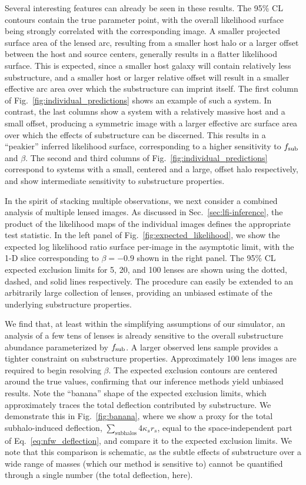 \documentclass[twocolumn]{aastex62}
\begin{document}
Several interesting features can already be seen in these results. The 95\% CL contours contain the true parameter point, with the overall likelihood surface being strongly correlated with the corresponding image. A smaller projected surface area of the lensed arc, resulting from a smaller host halo or a larger offset between the host and source centers, generally results in a flatter likelihood surface. This is expected, since a smaller host galaxy will contain relatively less substructure, and a smaller host or larger relative offset will result in a smaller effective arc area over which the substructure can imprint itself. The first column of Fig.~\ref{fig:individual_predictions} shows an example of such a system. In contrast, the last columns show a system with a relatively massive host and a small offset, producing a symmetric image with a larger effective arc surface area over which the effects of substructure can be discerned. This results in a ``peakier'' inferred likelihood surface, corresponding to a higher sensitivity to $f_{\mathrm{sub}}$ and $\beta$. The second and third columns of Fig.~\ref{fig:individual_predictions} correspond to systems with a small, centered and a large, offset halo respectively, and show intermediate sensitivity to substructure properties.

In the spirit of stacking multiple observations, we next consider a combined analysis of multiple lensed images. As discussed in Sec.~\ref{sec:lfi-inference}, the product of the likelihood maps of the individual images defines the appropriate test statistic. In the left panel of Fig.~\ref{fig:expected_likelihood}, we show the expected log likelihood ratio surface per-image in the asymptotic limit, with the 1-D slice corresponding to $\beta = -0.9$ shown in the right panel. The 95\% CL expected exclusion limits for 5, 20, and 100 lenses are shown using the dotted, dashed, and solid lines respectively. The procedure can easily be extended to an arbitrarily large collection of lenses, providing an unbiased estimate of the underlying substructure properties.

We find that, at least within the simplifying assumptions of our simulator, an analysis of a few tens of lenses is already sensitive to the overall substructure abundance parameterized by $f_{\mathrm{sub}}$. A larger observed lens sample provides a tighter constraint on substructure properties. Approximately 100 lens images are required to begin resolving $\beta$. The expected exclusion contours are centered around the true values, confirming that our inference methods yield unbiased results. Note the ``banana'' shape of the expected exclusion limits, which approximately traces the total deflection contributed by substructure. We demonstrate this in Fig.~\ref{fig:banana}, where we show a proxy for the total subhalo-induced deflection, $\sum_{\text{subhalos}} 4 \kappa_s r_s$, equal to the space-independent part of Eq.~\eqref{eq:nfw_deflection}, and compare it to the expected exclusion limits. We note that this comparison is schematic, as the subtle effects of substructure over a wide range of masses (which our method is sensitive to) cannot be quantified through a single number (the total deflection, here).
\end{document}
